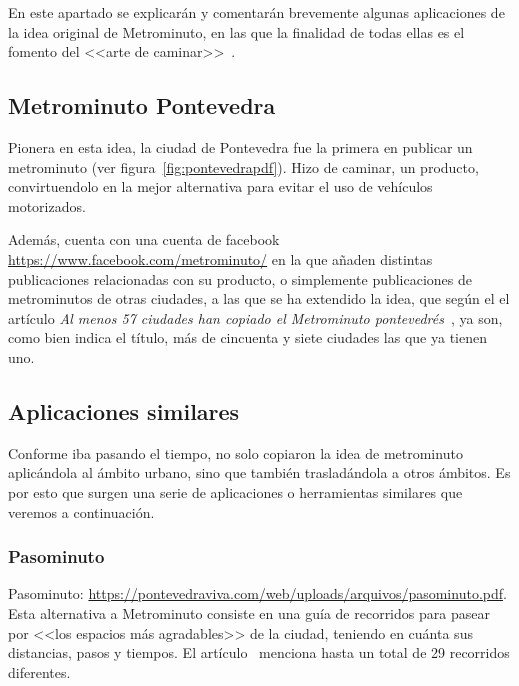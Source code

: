 
En este apartado se explicarán y comentarán brevemente algunas aplicaciones de la idea original de Metrominuto, en las que la finalidad de todas ellas es el fomento del <<arte de caminar>>~\cite{wiki:metrominuto-pontevedra}.



\subsection{Metrominuto Pontevedra}

Pionera en esta idea, la ciudad de Pontevedra fue la primera en publicar un metrominuto (ver figura~\ref{fig:pontevedrapdf}). Hizo de caminar, un producto, convirtuendolo en la mejor alternativa para evitar el uso de vehículos motorizados.


Además, cuenta con una cuenta de facebook \url{https://www.facebook.com/metrominuto/} en la que añaden distintas publicaciones relacionadas con su producto, o simplemente publicaciones de metrominutos de otras ciudades, a las que se ha extendido la idea, que según el el artículo \textit{Al menos 57 ciudades han copiado el Metrominuto pontevedrés}~\cite{art:metromin-ciudades}, ya son, como bien indica el título, más de cincuenta y siete ciudades las que ya tienen uno.



\subsection{Aplicaciones similares}

Conforme iba pasando el tiempo, no solo copiaron la idea de metrominuto aplicándola al ámbito urbano, sino que también trasladándola a otros ámbitos. Es por esto que surgen una serie de aplicaciones o herramientas similares que veremos a continuación.


\subsubsection{Pasominuto}
Pasominuto: \url{https://pontevedraviva.com/web/uploads/arquivos/pasominuto.pdf}.
Esta alternativa a Metrominuto consiste en una guía de recorridos para pasear por <<los espacios más agradables>> de la ciudad, teniendo en cuánta sus distancias, pasos y tiempos. El artículo~\cite{art:pasominuto} menciona hasta un total de 29 recorridos diferentes.


